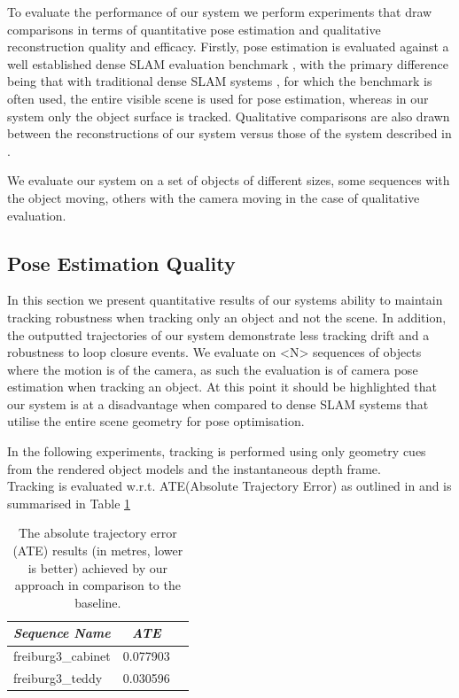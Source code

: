 To evaluate the performance of our system we perform experiments that draw comparisons in terms of quantitative pose estimation and qualitative reconstruction quality and efficacy.
Firstly, pose estimation is evaluated against a well established dense SLAM evaluation benchmark \cite{sturm12iros}, with the primary difference being that with traditional dense SLAM 
systems \cite{Prisacariu2014,Niessner2013,Newcombe2011}, for which the benchmark is often used, the entire visible scene is used for pose estimation, whereas in our system only the object 
surface is tracked. Qualitative comparisons are also drawn between the reconstructions of our system versus those of the system described in \cite{Ren2013}.

We evaluate our system on a set of objects of different sizes, some sequences with the object moving, others with the camera moving in the case of qualitative evaluation. 

\subsection{Pose Estimation Quality}
In this section we present quantitative results of our systems ability to maintain tracking robustness when tracking only an object and not the scene. In addition, the outputted trajectories 
of our system demonstrate less tracking drift and a robustness to loop closure events. We evaluate on <N> sequences of objects where the motion is of the camera, as such the evaluation is of 
camera pose estimation when tracking an object. At this point it should be highlighted that our system is at a disadvantage when compared to dense SLAM systems that utilise the entire scene 
geometry for pose optimisation.

In the following experiments, tracking is performed using only geometry cues from the rendered object models and the instantaneous depth frame.\\

Tracking is evaluated w.r.t. ATE(Absolute Trajectory Error) as outlined in \cite{sturm12iros} and is summarised in Table \ref{ateTable}
\begin{table}[!t]
	{\small
		\begin{center}
			\begin{tabular}{l@{\hskip 1cm} c c}
				\emph{Sequence Name} & \emph{ATE}\\
				\midrule
				\textsf{freiburg3\_cabinet} & 0.077903\\
				\textsf{freiburg3\_teddy} & 0.030596\\
			\end{tabular}
		\end{center}
	}
	\caption{The absolute trajectory error (ATE) results (in metres, lower is better) achieved by our approach in comparison to the baseline.}
	\label{ateTable}
\end{table}

